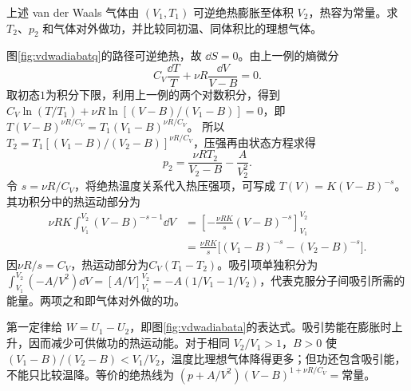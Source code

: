 \begin{example}[实际气体的可逆绝热膨胀]\label{ex:vdwadiabat}
上述 van der Waals 气体由 $(V_1,T_1)$ 可逆绝热膨胀至体积 $V_2$，热容为常量。求 $T_2$、$p_2$ 和气体对外做功，并比较同初温、同体积比的理想气体。
\end{example}
\begin{solution}
图\ref{fig:vdwadiabatq}的路径可逆绝热，故 $\dd S=0$。由上一例的熵微分
\[
 C_V\frac{\dd T}T+\nu R\frac{\dd V}{V-B}=0.
\]
取初态$1$为积分下限，利用上一例的两个对数积分，得到$C_V\ln(T/T_1)+\nu R\ln[(V-B)/(V_1-B)]=0$，即$T(V-B)^{\nu R/C_V}=T_1(V_1-B)^{\nu R/C_V}$。
所以 $T_2=T_1[(V_1-B)/(V_2-B)]^{\nu R/C_V}$，压强再由状态方程求得
\[
 p_2=\frac{\nu RT_2}{V_2-B}-\frac A{V_2^2}.
\]
令 $s=\nu R/C_V$，将绝热温度关系代入热压强项，可写成 $T(V)=K(V-B)^{-s}$。其功积分中的热运动部分为
\begin{align*}
 \nu RK\int_{V_1}^{V_2}(V-B)^{-s-1}\dd V
 &=\left[-\frac{\nu RK}{s}(V-B)^{-s}\right]_{V_1}^{V_2}\\
 &=\frac{\nu RK}{s}\bigl[(V_1-B)^{-s}-(V_2-B)^{-s}\bigr].
\end{align*}
因$\nu R/s=C_V$，热运动部分为$C_V(T_1-T_2)$。吸引项单独积分为$\int_{V_1}^{V_2}(-A/V^2)\dd V=[A/V]_{V_1}^{V_2}=-A(1/V_1-1/V_2)$，代表克服分子间吸引所需的能量。两项之和即气体对外做的功。

第一定律给 $W=U_1-U_2$，即图\ref{fig:vdwadiabata}的表达式。吸引势能在膨胀时上升，因而减少可供做功的热运动能。对于相同 $V_2/V_1>1$，$B>0$ 使 $(V_1-B)/(V_2-B)<V_1/V_2$，温度比理想气体降得更多；但功还包含吸引能，不能只比较温降。等价的绝热线为 $(p+A/V^2)(V-B)^{1+\nu R/C_V}=\text{常量}$。
\end{solution}

